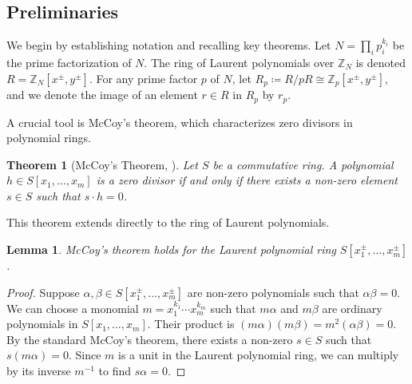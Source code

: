\documentclass[aps,prb,english,superscriptaddress,twocolumn,tightenlines,showpacs,longbibliography,floatfix,amsfonts]{revtex4-2}
\newtheorem{thm}{Theorem}
\newtheorem{lem}{Lemma}
\begin{document}
\subsection{Preliminaries}
We begin by establishing notation and recalling key theorems. Let $N = \prod_{i}p_i^{k_i}$ be the prime factorization of $N$. The ring of Laurent polynomials over $\mathbb{Z}_N$ is denoted $R=\mathbb{Z}_N[x^{\pm},y^{\pm}]$. For any prime factor $p$ of $N$, let $R_p \coloneqq R/pR \cong \mathbb{Z}_p[x^{\pm},y^{\pm}]$, and we denote the image of an element $r \in R$ in $R_p$ by $r_p$.

A crucial tool is McCoy's theorem, which characterizes zero divisors in polynomial rings.
\begin{thm}[McCoy's Theorem, \cite{Mccoy1942, Mccoy1957}]
Let $S$ be a commutative ring. A polynomial $h \in S[x_1, \dots, x_m]$ is a zero divisor if and only if there exists a non-zero element $s \in S$ such that $s\cdot h=0$.
\end{thm}

This theorem extends directly to the ring of Laurent polynomials.
\begin{lem}
McCoy's theorem holds for the Laurent polynomial ring $S[x_1^{\pm}, \dots, x_m^{\pm}]$.
\label{lem:mccoy_laurent}
\end{lem}
\begin{proof}
Suppose $\alpha, \beta \in S[x_1^{\pm}, \dots, x_m^{\pm}]$ are non-zero polynomials such that $\alpha\beta = 0$. We can choose a monomial $m = x_1^{k_1} \cdots x_m^{k_m}$ such that $m\alpha$ and $m\beta$ are ordinary polynomials in $S[x_1, \dots, x_m]$. Their product is $(m\alpha)(m\beta) = m^2(\alpha\beta) = 0$. By the standard McCoy's theorem, there exists a non-zero $s \in S$ such that $s(m\alpha) = 0$. Since $m$ is a unit in the Laurent polynomial ring, we can multiply by its inverse $m^{-1}$ to find $s\alpha=0$.
\end{proof}
\end{document}
